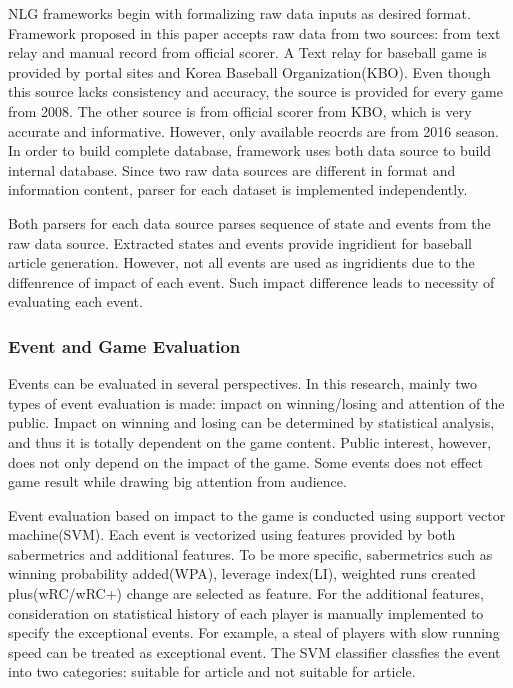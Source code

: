 \documentclass[11pt,letterpaper]{article}
\begin{document}
NLG frameworks begin with formalizing raw data inputs as desired format. Framework proposed in this paper accepts raw data from two sources: from text relay and manual record from official scorer. A Text relay for baseball game is provided by portal sites and Korea Baseball Organization(KBO). Even though this source lacks consistency and accuracy, the source is provided for every game from 2008. The other source is from official scorer from KBO, which is very accurate and informative. However, only available reocrds are from 2016 season. In order to build complete database, framework uses both data source to build internal database. Since two raw data sources are different in format and information content, parser for each dataset is implemented independently. 

Both parsers for each data source parses sequence of state and events from the raw data source. Extracted states and events provide ingridient for baseball article generation. However, not all events are used as ingridients due to the diffenrence of impact of each event. Such impact difference leads to necessity of evaluating each event. 

\subsubsection{Event and Game Evaluation} 

Events can be evaluated in several perspectives. In this research, mainly two types of event evaluation is made: impact on winning/losing and attention of the public. Impact on winning and losing can be determined by statistical analysis, and thus it is totally dependent on the game content. Public interest, however, does not only depend on the impact of the game. Some events does not effect game result while drawing big attention from audience. 

Event evaluation based on impact to the game is conducted using support vector machine(SVM). Each event is vectorized using features provided by both sabermetrics and additional features. To be more specific, sabermetrics such as winning probability added(WPA), leverage index(LI), weighted runs created plus(wRC/wRC+) change are selected as feature. For the additional features, consideration on statistical history of each player is manually implemented to specify the exceptional events. For example, a steal of players with slow running speed can be treated as exceptional event. The SVM classifier classfies the event into two categories: suitable for article and not suitable for article. 
\end{document}
